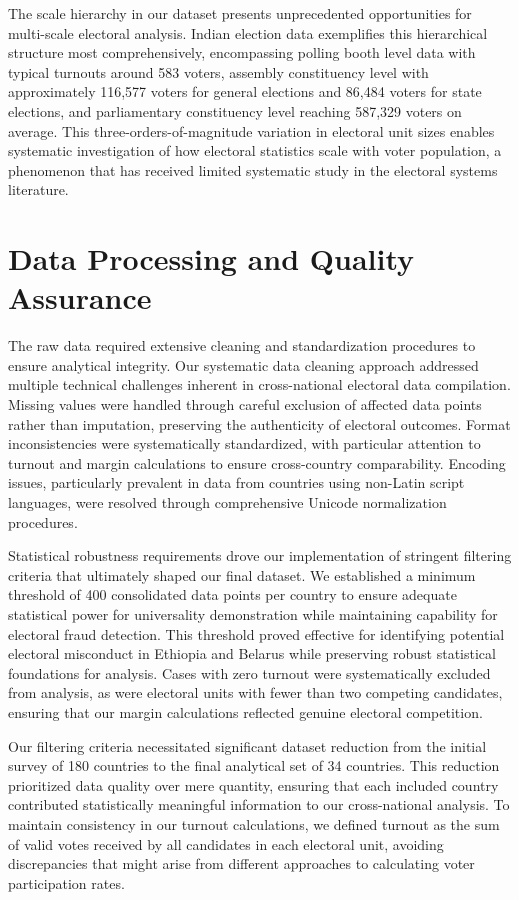 The scale hierarchy in our dataset presents unprecedented opportunities for multi-scale electoral analysis. Indian election data exemplifies this hierarchical structure most comprehensively, encompassing polling booth level data with typical turnouts around 583 voters, assembly constituency level with approximately 116,577 voters for general elections and 86,484 voters for state elections, and parliamentary constituency level reaching 587,329 voters on average. This three-orders-of-magnitude variation in electoral unit sizes enables systematic investigation of how electoral statistics scale with voter population, a phenomenon that has received limited systematic study in the electoral systems literature.

\section{Data Processing and Quality Assurance}

The raw data required extensive cleaning and standardization procedures to ensure analytical integrity. Our systematic data cleaning approach addressed multiple technical challenges inherent in cross-national electoral data compilation. Missing values were handled through careful exclusion of affected data points rather than imputation, preserving the authenticity of electoral outcomes. Format inconsistencies were systematically standardized, with particular attention to turnout and margin calculations to ensure cross-country comparability. Encoding issues, particularly prevalent in data from countries using non-Latin script languages, were resolved through comprehensive Unicode normalization procedures.

Statistical robustness requirements drove our implementation of stringent filtering criteria that ultimately shaped our final dataset. We established a minimum threshold of 400 consolidated data points per country to ensure adequate statistical power for universality demonstration while maintaining capability for electoral fraud detection. This threshold proved effective for identifying potential electoral misconduct in Ethiopia and Belarus while preserving robust statistical foundations for analysis. Cases with zero turnout were systematically excluded from analysis, as were electoral units with fewer than two competing candidates, ensuring that our margin calculations reflected genuine electoral competition.

Our filtering criteria necessitated significant dataset reduction from the initial survey of 180 countries to the final analytical set of 34 countries. This reduction prioritized data quality over mere quantity, ensuring that each included country contributed statistically meaningful information to our cross-national analysis. To maintain consistency in our turnout calculations, we defined turnout as the sum of valid votes received by all candidates in each electoral unit, avoiding discrepancies that might arise from different approaches to calculating voter participation rates.

